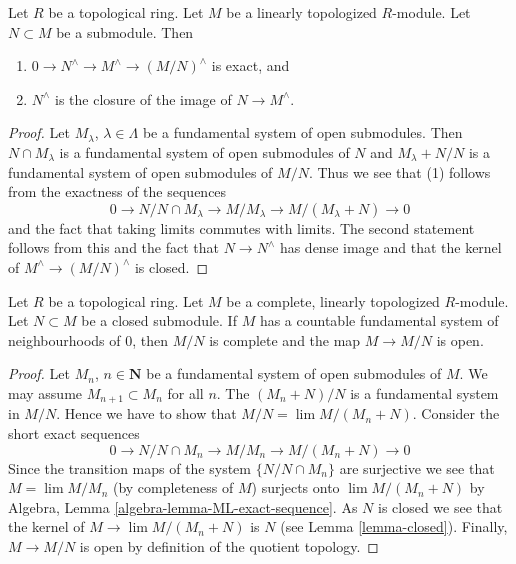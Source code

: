\begin{lemma}
\label{lemma-closure}
Let $R$ be a topological ring. Let $M$ be a linearly topologized
$R$-module. Let $N \subset M$ be a submodule. Then
\begin{enumerate}
\item $0 \to N^\wedge \to M^\wedge \to (M/N)^\wedge$ is exact, and
\item $N^\wedge$ is the closure of the image of $N \to M^\wedge$.
\end{enumerate}
\end{lemma}

\begin{proof}
Let $M_\lambda$, $\lambda \in \Lambda$ be a fundamental system of
open submodules. Then $N \cap M_\lambda$ is a fundamental system
of open submodules of $N$ and $M_\lambda + N/N$ is a fundamental system
of open submodules of $M/N$. Thus we see that (1) follows from
the exactness of the sequences
$$
0 \to N/N \cap M_\lambda \to M/M_\lambda \to M/(M_\lambda + N) \to 0
$$
and the fact that taking limits commutes with limits. The second
statement follows from this and the fact that $N \to N^\wedge$
has dense image and that the kernel of $M^\wedge \to (M/N)^\wedge$ is closed.
\end{proof}

\begin{lemma}
\label{lemma-quotient-by-closed}
Let $R$ be a topological ring. Let $M$ be a complete, linearly topologized
$R$-module. Let $N \subset M$ be a closed submodule. If $M$ has a
countable fundamental system of neighbourhoods of $0$, then
$M/N$ is complete and the map $M \to M/N$ is open.
\end{lemma}

\begin{proof}
Let $M_n$, $n \in \mathbf{N}$ be a fundamental system of open submodules of $M$.
We may assume $M_{n + 1} \subset M_n$
for all $n$. The $(M_n + N)/N$ is a fundamental system in $M/N$.
Hence we have to show that $M/N = \lim M/(M_n + N)$. Consider
the short exact sequences
$$
0 \to N/N \cap M_n \to M/M_n \to M/(M_n + N) \to 0
$$
Since the transition maps of the system $\{N/N\cap M_n\}$ are surjective
we see that $M = \lim M/M_n$ (by completeness of $M$) surjects onto
$\lim M/(M_n + N)$ by
Algebra, Lemma \ref{algebra-lemma-ML-exact-sequence}.
As $N$ is closed we see that the kernel of $M \to \lim M/(M_n + N)$
is $N$ (see Lemma \ref{lemma-closed}). Finally, $M \to M/N$
is open by definition of the quotient topology.
\end{proof}

